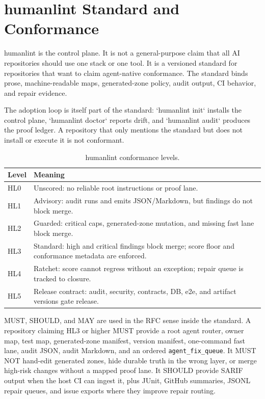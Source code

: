 \section{humanlint Standard and Conformance}

humanlint is the control plane. It is not a general-purpose claim that all AI repositories should use one stack or one tool. It is a versioned standard for repositories that want to claim agent-native conformance. The standard binds prose, machine-readable maps, generated-zone policy, audit output, CI behavior, and repair evidence.

The adoption loop is itself part of the standard: `humanlint init` installs the control plane, `humanlint doctor` reports drift, and `humanlint audit` produces the proof ledger. A repository that only mentions the standard but does not install or execute it is not conformant.

\begin{table}[t]
\caption{humanlint conformance levels.}
\label{tab:conformance}
\centering
\small
\begin{tabularx}{\columnwidth}{L{0.16\columnwidth} Y}
\toprule
\textbf{Level} & \textbf{Meaning} \\
\midrule
HL0 & Unscored: no reliable root instructions or proof lane. \\
HL1 & Advisory: audit runs and emits JSON/Markdown, but findings do not block merge. \\
HL2 & Guarded: critical caps, generated-zone mutation, and missing fast lane block merge. \\
HL3 & Standard: high and critical findings block merge; score floor and conformance metadata are enforced. \\
HL4 & Ratchet: score cannot regress without an exception; repair queue is tracked to closure. \\
HL5 & Release contract: audit, security, contracts, DB, e2e, and artifact versions gate release. \\
\bottomrule
\end{tabularx}
\end{table}

MUST, SHOULD, and MAY are used in the RFC sense inside the standard. A repository claiming HL3 or higher MUST provide a root agent router, owner map, test map, generated-zone manifest, version manifest, one-command fast lane, audit JSON, audit Markdown, and an ordered \texttt{agent\_fix\_queue}. It MUST NOT hand-edit generated zones, hide durable truth in the wrong layer, or merge high-risk changes without a mapped proof lane. It SHOULD provide SARIF output when the host CI can ingest it, plus JUnit, GitHub summaries, JSONL repair queues, and issue exports where they improve repair routing.

